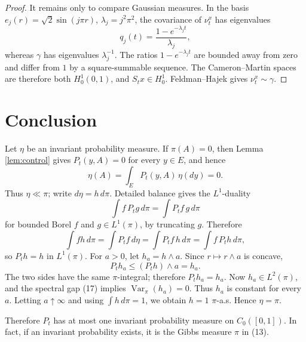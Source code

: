 \documentclass[12pt]{article}
\newcommand{\1}{\mathbf 1}
\newcommand{\Var}{\operatorname{Var}}
\begin{document}
\begin{proof}
It remains only to compare Gaussian measures.  In the basis
\(e_j(r)=\sqrt2\sin(j\pi r)\), \(\lambda_j=j^2\pi^2\), the covariance of
\(\nu_t^x\) has eigenvalues
\[
        q_j(t)=\frac{1-e^{-\lambda_jt}}{\lambda_j},
\]
whereas \(\gamma\) has eigenvalues \(\lambda_j^{-1}\).  The ratios
\(1-e^{-\lambda_jt}\) are bounded away from zero and differ from \(1\) by a
square-summable sequence.  The Cameron--Martin spaces are therefore both
\(H^1_0(0,1)\), and \(S_tx\in H^1_0\).  Feldman--Hajek gives
\(\nu_t^x\sim\gamma\).
\end{proof}

\section*{Conclusion}

Let \(\eta\) be an invariant probability measure.  If \(\pi(A)=0\), then
Lemma \ref{lem:control} gives \(P_t(y,A)=0\) for every \(y\in E\), and hence
\[
        \eta(A)=\int_E P_t(y,A)\,\eta(dy)=0.
\]
Thus \(\eta\ll\pi\); write \(d\eta=h\,d\pi\).  Detailed balance gives the
\(L^1\)-duality
\[
        \int f\,P_t g\,d\pi=\int P_t f\,g\,d\pi
\]
for bounded Borel \(f\) and \(g\in L^1(\pi)\), by truncating \(g\).  Therefore
\[
 \int f h\,d\pi=\int P_tf\,d\eta
      =\int P_tf\,h\,d\pi=\int f\,P_t h\,d\pi ,
\]
so \(P_t h=h\) in \(L^1(\pi)\).  For \(a>0\), let \(h_a=h\wedge a\).  Since
\(r\mapsto r\wedge a\) is concave,
\[
        P_t h_a\le (P_t h)\wedge a=h_a .
\]
The two sides have the same \(\pi\)-integral; therefore \(P_t h_a=h_a\).
Now \(h_a\in L^2(\pi)\), and the spectral gap (17) implies
\(\Var_\pi(h_a)=0\).  Thus \(h_a\) is constant for every \(a\).  Letting
\(a\uparrow\infty\) and using \(\int h\,d\pi=1\), we obtain \(h=1\)
\(\pi\)-a.s.  Hence \(\eta=\pi\).

Therefore \(P_t\) has at most one invariant probability measure on
\(C_0([0,1])\).  In fact, if an invariant probability exists, it is the Gibbs
measure \(\pi\) in (13).
\end{document}
